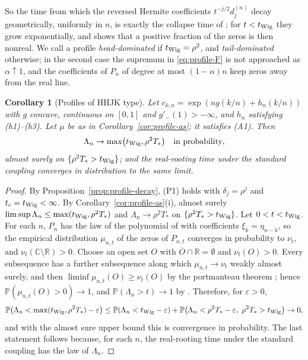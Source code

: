 \documentclass[11pt]{amsart}
\newtheorem{corollary}[theorem]{Corollary}
\theoremstyle{definition}
\theoremstyle{remark}
\numberwithin{equation}{section}
\newcommand{\C}{\mathbb{C}}
\newcommand{\R}{\mathbb{R}}
\newcommand{\PP}{\mathbb{P}}
\newcommand{\eps}{\varepsilon}
\begin{document}
So the time from which the reversed Hermite coefficients $t^{-j/2}d^{(n)}_j$ decay geometrically, uniformly in $n$, is exactly the collapse time of \cite{HHJK}; for $t<t_{\rm Wig}$ they grow exponentially, and \cite[Theorem~2.12]{HHJK} shows that a positive fraction of the zeros is then nonreal. We call a profile \emph{head-dominated} if $t_{\rm Wig}=\rho^2$, and \emph{tail-dominated} otherwise; in the second case the supremum in \eqref{eq:profile-F} is not approached as $\alpha\uparrow1$, and the coefficients of $P_n$ of degree at most $(1-\alpha)n$ keep zeros away from the real line.

\begin{corollary}[Profiles of HHJK type]\label{cor:profile-hhjk}
Let $c_{k,n}=\exp(ng(k/n)+h_n(k/n))$ with $g$ concave, continuous on $[0,1]$ and $g'_-(1)>-\infty$, and $h_n$ satisfying (h1)--(h3). Let $\mu$ be as in Corollary~\ref{cor:profile-as}; it satisfies (A1). Then
\[
\Lambda_n\to\max\bigl(t_{\rm Wig},\rho^2T_*\bigr)\quad\text{in probability},
\]
almost surely on $\{\rho^2T_*>t_{\rm Wig}\}$; and the real-rooting time under the standard coupling converges in distribution to the same limit.
\end{corollary}

\begin{proof}
By Proposition~\ref{prop:profile-decay}, (P1) holds with $\delta_j=\rho^j$ and $t_c=t_{\rm Wig}<\infty$. By Corollary~\ref{cor:profile-as}(i), almost surely $\limsup\Lambda_n\le\max(t_{\rm Wig},\rho^2T_*)$ and $\Lambda_n\to\rho^2T_*$ on $\{\rho^2T_*>t_{\rm Wig}\}$. Let $0<t<t_{\rm Wig}$. For each $n$, $P_n$ has the law of the polynomial of \cite{HHJK} with coefficients $\xi_k=\eta_{n-k}$, so the empirical distribution $\mu_{n,t}$ of the zeros of $P_{n,t}$ converges in probability to $\nu_t$, and $\nu_t(\C\setminus\R)>0$. Choose an open set $O$ with $\overline O\cap\R=\emptyset$ and $\nu_t(O)>0$. Every subsequence has a further subsequence along which $\mu_{n,t}\to\nu_t$ weakly almost surely, and then $\liminf\mu_{n,t}(O)\ge\nu_t(O)$ by the portmanteau theorem \cite[Chapter~1]{Bi2}; hence $\PP(\mu_{n,t}(O)>0)\to1$, and $\PP(\Lambda_n>t)\to1$ by \cite[Lemma~\ref{M-lem:heat}(c)]{Main}. Therefore, for $\eps>0$,
\[
\PP\bigl(\Lambda_n<\max(t_{\rm Wig},\rho^2T_*)-\eps\bigr)\le\PP(\Lambda_n<t_{\rm Wig}-\eps)+\PP\bigl(\Lambda_n<\rho^2T_*-\eps,\ \rho^2T_*>t_{\rm Wig}\bigr)\to0,
\]
and with the almost sure upper bound this is convergence in probability. The last statement follows because, for each $n$, the real-rooting time under the standard coupling has the law of $\Lambda_n$.
\end{proof}
\end{document}
